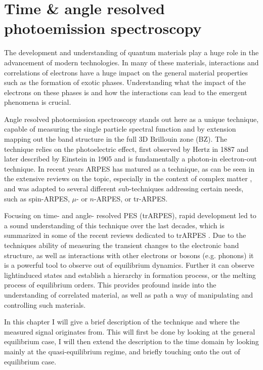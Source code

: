 \chapter{Time \& angle resolved photoemission spectroscopy}

The development and understanding of quantum materials play a huge role in the advancement of modern technologies.
In many of these materials, interactions and correlations of electrons have a huge impact on the general material properties such as the formation of exotic phases.
Understanding what the impact of the electrons on these phases is and how the interactions can lead to the emergent phenomena is crucial.

Angle resolved photoemission spectroscopy stands out here as a unique technique, capable of measuring the single particle spectral function and by extension mapping out the band structure in the full 3D Brillouin zone (BZ).
The technique relies on the photoelectric effect, first observed by Hertz in 1887 \cite{hertz_ueber_1887} and later described by Einstein in 1905 \cite{einstein_uber_1905} and is fundamentally a photon-in electron-out technique.
In recent years ARPES has matured as a technique, as can be seen in the extensive reviews on the topic, especially in the context of complex matter \cite{damascelli_angle-resolved_2003,damascelli_angle-resolved_2003,lu_angle-resolved_2012,gedik_photoemission_2017,lv_angle-resolved_2019,zhang_angle-resolved_2022}, and was adapted to several different sub-techniques addressing certain needs, such as spin-ARPES, $\mu$- or $n$-ARPES, or tr-ARPES.

Focusing on time- and angle- resolved PES (trARPES), rapid development led to a sound understanding of this technique over the last decades, which is summarized in some of the recent reviews dedicated to trARPES \cite{smallwood_ultrafast_2016,huang_high-resolution_2022,boschini_time-resolved_2024}.
Due to the techniques ability of measuring the transient changes to the electronic band structure, as well as interactions with other electrons or bosons (e.g. phonons) it is a powerful tool to observe out of equilibrium dynamics.
Further it can observe lightinduced states and establish a hierarchy in formation process, or the melting process of equilibrium orders.
This provides profound inside into the understanding of correlated material, as well as path a way of manipulating and controlling such materials.

In this chapter I will give a brief description of the technique and where the measured signal originates from.
This will first be done by looking at the general equilibrium case, I will then extend the description to the time domain by looking mainly at the quasi-equilibrium regime, and briefly touching onto the out of equilibrium case.

